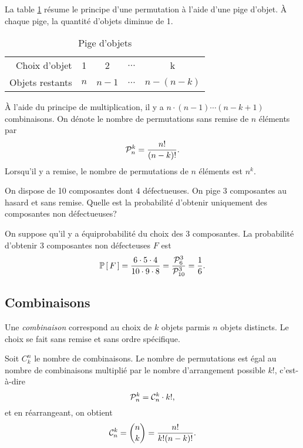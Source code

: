 \documentclass[11pt]{article}
\newcommand\comb[2]{%
	\ensuremath{%
		\mathcal{C}_{#2}^{#1}%
	}%
}%
\newcommand\perm[2]{%
	\ensuremath{%
		\mathcal{P}_{#2}^{#1}%
	}%
}%
\renewcommand\P[1]{%
	\ensuremath{%
		\mathbb{P}\left[\,#1\,\right]%
	}%
}%
\begin{document}
La table \ref{tb:permutation} résume le principe d'une permutation à l'aide
d'une pige d'objet. À chaque pige, la quantité d'objets diminue de 1.

\begin{table}[H]
	\centering
	\caption{Pige d'objets}
	\begin{tabular}{r|cccc}
		\toprule
		Choix d'objet   &   1 &   2   & $\dots$ & k\\
		Objets restants & $n$ & $n-1$ & $\dots$ & $n-(n-k)$\\
		\bottomrule
	\end{tabular}
	\label{tb:permutation}
\end{table}

À l'aide du principe de multiplication, il y a $n\cdot(n-1)\cdots(n-k+1)$
combinaisons. On dénote le nombre de permutations sans remise de $n$ éléments
par
\begin{equation*}
	\perm{k}{n}=\frac{n!}{(n-k)!}.
\end{equation*}
Lorsqu'il y a remise, le nombre de permutations de $n$ éléments est $n^k$.

\begin{exemple}
	On dispose de 10 composantes dont 4 défectueuses. On pige 3 composantes au
	hasard et sans remise. Quelle est la probabilité d'obtenir uniquement des
	composantes non défectueuses?

	On suppose qu'il y a équiprobabilité du choix des 3 composantes. La
	probabilité d'obtenir 3 composantes non défecteuses $F$ est
	\begin{equation*}
		\P{F}
		=\frac{6\cdot 5\cdot 4}{10\cdot 9\cdot 8}
		=\frac{\perm{3}{6}}{\perm{3}{10}}
		=\frac{1}{6}.
	\end{equation*}
\end{exemple}

\subsection{Combinaisons}
\begin{definition}
	Une \textit{combinaison} correspond au choix de $k$ objets parmis $n$
	objets distincts. Le choix se fait sans remise et sans ordre spécifique.
\end{definition}

Soit $C_k^n$ le nombre de combinaisons. Le nombre de permutations est égal au
nombre de combinaisons multiplié par le nombre d'arrangement possible $k!$,
c'est-à-dire 
\begin{equation*}
	\perm{k}{n}=\comb{k}{n}\cdot k!,
\end{equation*}
et en réarrangeant, on obtient
\begin{equation*}
	\comb{k}{n}={{n}\choose{k}}=\frac{n!}{k!(n-k)!}.
\end{equation*}
\end{document}
